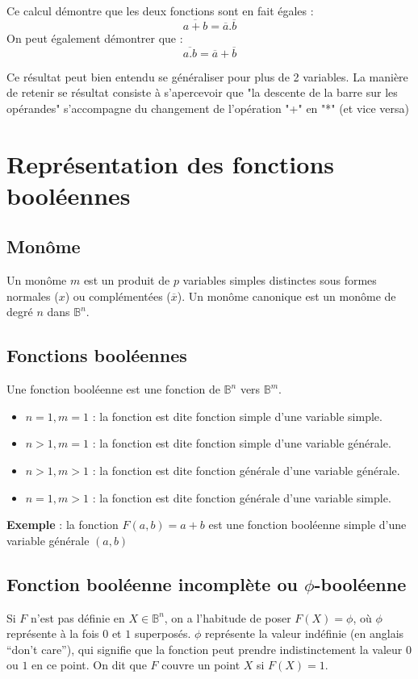 Ce calcul démontre que les deux fonctions sont en fait égales :
$$\boxed{\overline{a+b}=\overline{a}.\overline{b}}$$
On peut également démontrer que :
$$\boxed{\overline{a.b}=\overline{a}+\overline{b}}$$

Ce résultat peut bien entendu se généraliser pour plus de 2 variables. La manière de retenir se résultat consiste à s'apercevoir que
"la descente de la barre sur les opérandes" s'accompagne du changement de l'opération "+" en "*" (et vice versa)

\section{Représentation des fonctions booléennes}

\subsection{Monôme}
Un monôme $m$ est un produit de $p$ variables simples distinctes sous formes normales ($x$) ou complémentées ($\overline{x}$). Un monôme canonique est un monôme de degré $n$ dans $\mathbb{B}
^n$.

\subsection{Fonctions booléennes}
Une fonction booléenne est une fonction de $\mathbb{B}^n$ vers $\mathbb{B}^m$.

\begin{itemize}
\item $n=1,m=1$ : la fonction est dite fonction simple d'une variable simple.
\item $n>1,m=1$ : la fonction est dite fonction simple d'une variable générale.
\item $n>1,m>1$ : la fonction est dite fonction générale d'une variable générale.
\item $n=1,m>1$ : la fonction est dite fonction générale d'une variable simple.
\end{itemize}

{\bf Exemple} : la fonction $F(a,b)=a+b$ est une fonction booléenne simple d'une variable générale $(a,b)$

\subsection{Fonction booléenne incomplète ou $\phi$-booléenne}

Si $F$ n'est pas définie en $X\in \mathbb{B}^n$, on a l'habitude de poser $F(X)=\phi$, où $\phi$ représente à la fois $0$ et $1$ superposés. $\phi$ représente la valeur indéfinie (en anglais
 ``don't care''), qui signifie que la fonction peut prendre indistinctement la valeur $0$ ou $1$ en ce point. On dit que $F$ couvre un point $X$ si $F(X)=1$.

